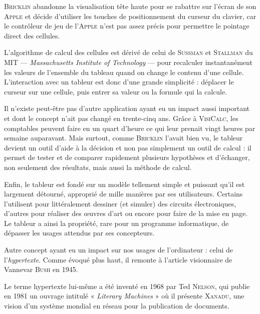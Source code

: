\textsc{Bricklin} abandonne la visualisation tête haute pour se rabattre sur l'écran de son \textsc{Apple} et décide d'utiliser les touches de positionnement du curseur du clavier, car le contrôleur de jeu de l'\textsc{Apple} n'est pas assez précis pour permettre le pointage direct des cellules.

L'algorithme de calcul des cellules est dérivé de celui de \textsc{Sussman} et \textsc{Stallman} du MIT --- \textit{Massachusetts Institute of Technology} --- pour recalculer instantanément les valeurs de l'ensemble du tableau quand on change le contenu d'une cellule. L’interaction avec un tableur est donc d’une grande simplicité : déplacer le curseur sur une cellule, puis entrer sa valeur ou la formule qui la calcule.

Il n'existe peut-être pas d'autre application ayant eu un impact aussi important et dont le concept n'ait pas changé en trente-cinq ans. Grâce à \textsc{VisiCalc}, les comptables peuvent faire en un quart d'heure ce qui leur prenait vingt heures par semaine auparavant. Mais surtout, comme \textsc{Bricklin} l'avait bien vu, le tableur devient un outil d'aide à la décision et non pas simplement un outil de calcul : il permet de tester et de comparer rapidement plusieurs hypothèses et d’échanger, non seulement des résultats, mais aussi la méthode de calcul. 

Enfin, le tableur est fondé sur un modèle tellement simple et puissant qu’il est largement détourné, approprié de mille manières par ses utilisateurs. Certains l’utilisent pour littéralement dessiner (et simuler) des circuits électroniques, d’autres pour réaliser des œuvres d’art ou encore pour faire de la mise en page.
Le tableur a ainsi la propriété, rare pour un programme informatique, de dépasser les usages attendus par ses concepteurs.




Autre concept ayant eu un impact sur nos usages de l’ordinateur : celui de l'\emph{hypertexte}. Comme évoqué plus haut, il remonte à l'article visionnaire de Vannevar \textsc{Bush} en 1945.

Le terme hypertexte lui-même a été inventé en 1968 par Ted \textsc{Nelson}, qui publie en 1981 un ouvrage intitulé « \textit{Literary Machines} » où il présente \textsc{Xanadu}, une vision d'un système mondial en réseau pour la publication de documents.

